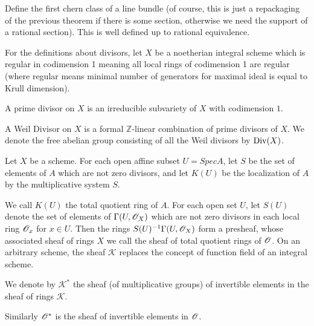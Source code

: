 \begin{definition}
  \label{def:firstchernclass}
  Define the first chern class of a line bundle (of course, this is just a repackaging
  of the previous theorem if there is some section, otherwise we need the support of 
  a rational section). This is well defined up to rational equivalence.
\end{definition}

\begin{definition}

\end{definition}


For the definitions about divisors, let $X$ be a noetherian integral scheme
which is regular in codimension 1 meaning all local rings of codimension 1 are
regular (where regular means minimal number of generators for maximal ideal is
equal to Krull dimension).

\begin{definition}\label{def:primediv}
  A prime divisor on $X$ is an irreducible subvariety of $X$ with codimension $1$.
  \end{definition}

\begin{definition}\label{def:weil}
  A Weil Divisor on $X$ is a formal $\mathbb{Z}$-linear combination of prime divisors of $X$. We denote the free abelian group consisting of all the Weil divisors by $\operatorname{Div}(X)$.
\end{definition}

\begin{definition}[Hartshorne p.140]\label{def:constratsheaf}
  Let $X$ be a scheme. For each open affine subset $U = Spec A$,
  let $S$ be the set of elements of $A$ which are not zero divisors,
  and let $K(U)$ be the localization of $A$ by the multiplicative system $S$.

  We call $K(U)$ the total quotient ring of $A$.
  For each open set $U$, let $S(U)$ denote the set of elements of
  $\Gamma(U, \mathscr{O}_X)$ which are not zero divisors in each local ring $\mathscr{O}_x$ for $x \in U$.
  Then the rings $S(U)^{-1} \Gamma(U,\mathscr{O}_X)$ form a presheaf,
  whose associated sheaf of rings $X$ we call the sheaf of total quotient rings
  of $\mathscr{O}$. On an arbitrary scheme, the sheaf $\mathscr{K}$ replaces the concept
  of function field of an integral scheme.

  We denote by $\mathscr{K}^*$ the sheaf (of multiplicative groups)
  of invertible elements in the sheaf of rings $\mathscr{K}$.

  Similarly $\mathscr{O}^*$ is the sheaf of invertible elements in $\mathscr{O}$.
\end{definition}


